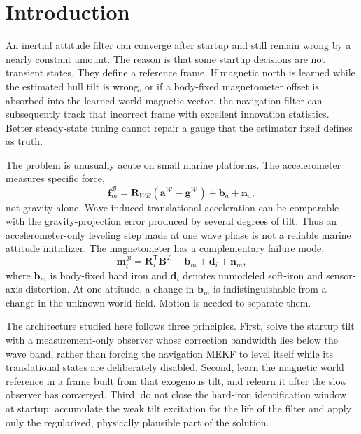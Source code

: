 \documentclass[conference]{IEEEtran}
\DeclareRobustCommand{\vct}[1]{\bm{#1}}
\DeclareRobustCommand{\mat}[1]{\bm{#1}}
\begin{document}
\section{Introduction}
\label{sec:introduction}

An inertial attitude filter can converge after startup and still remain wrong by a
nearly constant amount.  The reason is that some startup decisions are not transient
states.  They define a reference frame.  If magnetic north is learned while the
estimated hull tilt is wrong, or if a body-fixed magnetometer offset is absorbed into
the learned world magnetic vector, the navigation filter can subsequently track that
incorrect frame with excellent innovation statistics.  Better steady-state tuning
cannot repair a gauge that the estimator itself defines as truth.

The problem is unusually acute on small marine platforms.  The accelerometer measures
specific force,
\begin{equation}
\vct f_m^{\mathcal B}
 = \mat R_{WB}\left(\vct a^{\mathcal W}-\vct g^{\mathcal W}\right)
 + \vct b_a + \vct n_a,
\label{eq:acc-model}
\end{equation}
not gravity alone.  Wave-induced translational acceleration can be comparable with the
gravity-projection error produced by several degrees of tilt.  Thus an
accelerometer-only leveling step made at one wave phase is not a reliable marine
attitude initializer.  The magnetometer has a complementary failure mode,
\begin{equation}
\vct m_i^{\mathcal B}
 = \mat R_i^{\mathsf T}\vct B^{\mathcal L}
 + \vct b_m + \vct d_i + \vct n_m,
\label{eq:mag-model}
\end{equation}
where $\vct b_m$ is body-fixed hard iron and $\vct d_i$ denotes unmodeled soft-iron
and sensor-axis distortion.  At one attitude, a change in $\vct b_m$ is
indistinguishable from a change in the unknown world field.  Motion is needed to
separate them.

The architecture studied here follows three principles.  First, solve the startup
tilt with a measurement-only observer whose correction bandwidth lies below the wave
band, rather than forcing the navigation MEKF to level itself while its translational
states are deliberately disabled.  Second, learn the magnetic world reference in a
frame built from that exogenous tilt, and relearn it after the slow observer has
converged.  Third, do not close the hard-iron identification window at startup:
accumulate the weak tilt excitation for the life of the filter and apply only the
regularized, physically plausible part of the solution.
\end{document}
